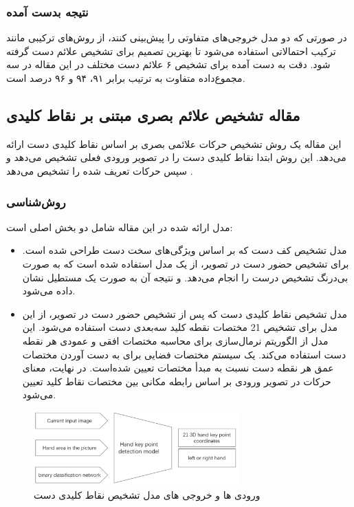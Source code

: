 \subsubsection{نتیجه بدست آمده}
در صورتی که دو مدل خروجی‌های متفاوتی را پیش‌بینی کنند، از روش‌های ترکیبی مانند ترکیب احتمالاتی استفاده می‌شود تا بهترین تصمیم برای تشخیص علائم دست گرفته شود.
دقت به دست آمده برای تشخیص ۶ علائم دست مختلف در این مقاله در سه مجموع‌داده متفاوت به ترتیب برابر ۹۱، ۹۴ و ۹۶ درصد است.




\subsection[مقاله تشخيص علائم بصری مبتنی بر نقاط کلیدی]{مقاله تشخيص علائم بصری مبتنی بر نقاط کلیدی \protect{}}
این مقاله یک روش تشخیص حرکات علائمی بصری بر اساس نقاط کلیدی دست ارائه می‌دهد. این روش ابتدا نقاط کلیدی دست را در تصویر ورودی فعلی تشخیص می‌دهد و سپس حرکات تعریف شده را تشخیص می‌دهد \cite{chen2021visual}.

\subsubsection{روش‌شناسی}
مدل ارائه شده در این مقاله شامل دو بخش اصلی است: 
\begin{itemize}
    \item مدل تشخیص کف دست که بر اساس ویژگی‌های سخت دست طراحی شده است. برای تشخیص حضور دست در تصویر، از یک مدل  استفاده شده است که به صورت بی‌درنگ
     تشخیص درست را انجام می‌دهد. و نتیجه آن به صورت یک مستطیل نشان داده می‌شود.
    \item    مدل تشخیص نقاط کلیدی دست که پس از تشخیص حضور دست در تصویر، از این مدل برای تشخیص 21 مختصات نقطه کلید سه‌بعدی دست استفاده می‌شود.  این مدل از الگوریتم نرمال‌سازی برای محاسبه مختصات افقی و عمودی هر نقطه 
    دست استفاده می‌کند. یک سیستم مختصات فضایی برای به دست آوردن مختصات عمق هر نقطه دست نسبت به مبدأ مختصات تعیین شده‌است. در نهایت، معنای حرکات در تصویر ورودی بر اساس رابطه مکانی بین مختصات نقاط کلید تعیین می‌شود.
     
\end{itemize}


\begin{figure}[h]
    \centering
    \includegraphics[width=0.7\textwidth]{keypoint.png}
    \caption[ورودی ها و خروجی های مدل تشخیص نقاط کلیدی دست]{ورودی ها و خروجی های مدل تشخیص نقاط کلیدی دست\cite{chen2021visual}}
\end{figure}

